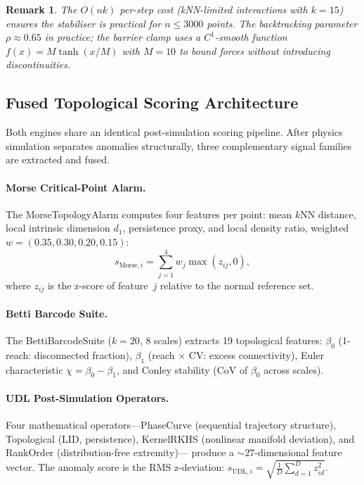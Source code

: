 \documentclass[final]{siamltex}
\newtheorem{remark}[theorem]{Remark}
\begin{document}
\begin{remark}\label{rem:convergence}
The $O(nk)$ per-step cost (kNN-limited interactions with $k = 15$)
ensures the stabiliser is practical for $n \le 3000$ points.
The backtracking parameter $\rho \approx 0.65$ in practice;
the barrier clamp uses a $C^1$-smooth function
$f(x) = M\tanh(x/M)$ with $M = 10$ to bound forces without
introducing discontinuities.
\end{remark}

\subsection{Fused Topological Scoring Architecture}\label{sec:fused}

Both engines share an identical post-simulation scoring pipeline.
After physics simulation separates anomalies structurally, three
complementary signal families are extracted and fused.

\paragraph{Morse Critical-Point Alarm.}
The MorseTopologyAlarm computes four features per point: mean $k$NN
distance, local intrinsic dimension $d_1$, persistence proxy, and
local density ratio, weighted $w = (0.35, 0.30, 0.20, 0.15)$:
\begin{equation}\label{eq:morse}
  s_{\mathrm{Morse},i} = \sum_{j=1}^{4} w_j\max(z_{ij}, 0),
\end{equation}
where $z_{ij}$ is the z-score of feature~$j$ relative to the
normal reference set.

\paragraph{Betti Barcode Suite.}
The BettiBarcodeSuite ($k=20$, 8 scales) extracts 19 topological
features: $\beta_0$ (1-reach: disconnected fraction),
$\beta_1$ (reach $\times$ CV: excess connectivity),
Euler characteristic $\chi = \beta_0 - \beta_1$, and
Conley stability (CoV of $\beta_0$ across scales).

\paragraph{UDL Post-Simulation Operators.}
Four mathematical operators---PhaseCurve (sequential trajectory
structure), Topological (LID, persistence), KernelRKHS (nonlinear
manifold deviation), and RankOrder (distribution-free extremity)---
produce a $\sim\!27$-dimensional feature vector.  The anomaly
score is the RMS z-deviation:
$s_{\mathrm{UDL},i} = \sqrt{\tfrac{1}{D}\sum_{d=1}^{D} z_{id}^2}$.
\end{document}
